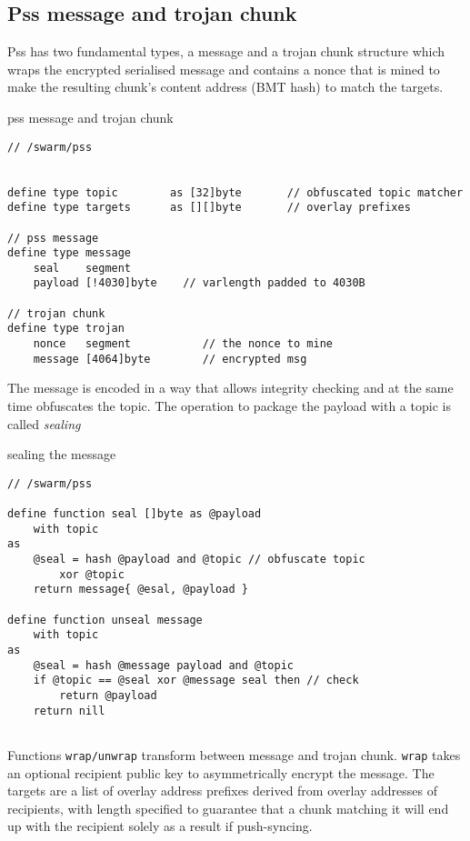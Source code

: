 \subsection{Pss message and trojan chunk}

Pss has two fundamental types, a message and a trojan chunk structure which wraps the encrypted serialised message and contains a nonce that is mined to make the resulting chunk's content address (BMT hash) to match the targets.


\begin{definition}{pss message and trojan chunk}\label{def:pss-message}
\begin{lstlisting}[language=buzz1]
// /swarm/pss


define type topic        as [32]byte       // obfuscated topic matcher
define type targets      as [][]byte       // overlay prefixes        

// pss message
define type message 
    seal    segment            
    payload [!4030]byte    // varlength padded to 4030B
    
// trojan chunk
define type trojan 
    nonce   segment           // the nonce to mine 
    message [4064]byte        // encrypted msg 
\end{lstlisting}
\end{definition}


The message is encoded in a way that allows integrity checking and at the same time obfuscates the topic. The operation to package the payload with a topic is called \emph{sealing}


\begin{definition}{sealing the message}\label{def:pss-sealing}
\begin{lstlisting}[language=buzz1]
// /swarm/pss

define function seal []byte as @payload
    with topic
as
    @seal = hash @payload and @topic // obfuscate topic
        xor @topic          
    return message{ @esal, @payload }

define function unseal message
    with topic 
as
    @seal = hash @message payload and @topic 
    if @topic == @seal xor @message seal then // check 
        return @payload 
    return nill
    
\end{lstlisting}
\end{definition}

Functions \lstinline{wrap/unwrap} transform between message and trojan chunk. \lstinline{wrap} takes an optional recipient public key to asymmetrically encrypt the message.
The targets are a list of overlay address prefixes derived from overlay addresses of recipients, with length specified to guarantee that a chunk matching it will end up with the recipient solely as a result if  push-syncing.   

